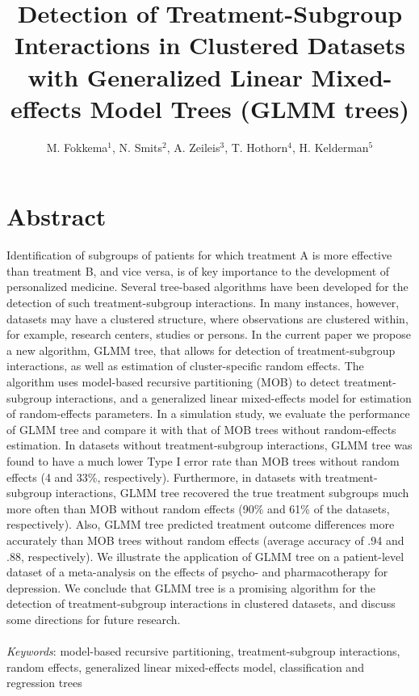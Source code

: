 \documentclass[nobf,doc]{apa}
\title{Detection of Treatment-Subgroup Interactions in Clustered Datasets with Generalized Linear Mixed-effects Model Trees (GLMM trees)}
\author{M. Fokkema$^1$, N. Smits$^2$, A. Zeileis$^3$, T. Hothorn$^4$, H. Kelderman$^5$}
\affiliation{$^1$Universiteit Leiden, $^2$Universiteit van Amsterdam, $^3$Universit\"{a}t Innsbruck, $^4$Universit\"{a}t Z\"{u}rich, $^5$Universiteit Leiden and Vrije Universiteit, Amsterdam}
\begin{document}
\maketitle
\pagewiselinenumbers

\section{Abstract}
Identification of subgroups of patients for which treatment A is more effective than treatment B, and vice versa, is of key importance to the development of personalized medicine. Several tree-based algorithms have been developed for the detection of such treatment-subgroup interactions. In many instances, however, datasets may have a clustered structure, where observations are clustered within, for example, research centers, studies or persons. In the current paper we propose a new algorithm, GLMM tree, that allows for detection of treatment-subgroup interactions, as well as estimation of cluster-specific random effects. The algorithm uses model-based recursive partitioning (MOB) to detect treatment-subgroup interactions, and a generalized linear mixed-effects model for estimation of random-effects parameters. In a simulation study, we evaluate the performance of GLMM tree and compare it with that of MOB trees without random-effects estimation. In datasets without treatment-subgroup interactions, GLMM tree was found to have a much lower Type I error rate than MOB trees without random effects (4 and 33\%, respectively). Furthermore, in datasets with treatment-subgroup interactions, GLMM tree recovered the true treatment subgroups much more often than MOB without random effects (90\% and 61\% of the datasets, respectively). Also, GLMM tree predicted treatment outcome differences more accurately than MOB trees without random effects (average accuracy of .94 and .88, respectively). We illustrate the application of GLMM tree on a patient-level dataset of a meta-analysis on the effects of psycho- and pharmacotherapy for depression. We conclude that GLMM tree is a promising algorithm for the detection of treatment-subgroup interactions in clustered datasets, and discuss some directions for future research.\\
\\
\textit{Keywords}: model-based recursive partitioning, treatment-subgroup interactions, random effects, generalized linear mixed-effects model, classification and regression trees
\end{document}
